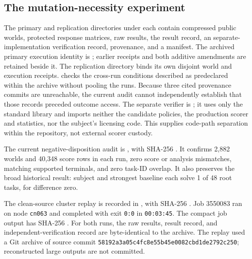 \subsection{The mutation-necessity experiment}
The primary and replication directories under
 each contain compressed public
worlds, protected response matrices, raw results, the result record, an
separate-implementation verification record, provenance, and a 
manifest.
The archived primary execution identity is ;
earlier receipts and both additive amendments are retained beside it. The
replication directory binds its own disjoint world and execution receipts.
 checks the cross-run conditions
described as predeclared within the archive without pooling the runs. Because
three cited provenance commits are unreachable, the current audit cannot
independently establish that those records preceded outcome access. The separate verifier is
; it uses only
the standard library and imports neither the candidate policies, the production
scorer and statistics, nor the subject's licensing code. This supplies code-path
separation within the repository, not external scorer custody.

The current negative-disposition audit is
, with SHA-256
.
It confirms 2,882 worlds and 40,348 score rows in each run, zero score or
analysis mismatches, matching supported terminals, and zero task-ID overlap.
It also preserves the broad historical result: subject and strongest baseline
each solve 1 of 48 root tasks, for difference zero.

The clean-source cluster replay is recorded in
,
with SHA-256
.
Job 3550083 ran on node \texttt{cn063} and completed with exit \texttt{0:0} in
\texttt{00:03:45}. The compact job output has SHA-256
.
For both runs, the raw results, result record, and independent-verification
record are byte-identical to the archive. The replay used a Git archive of
source commit \texttt{58192a3a05c4fc8e55b45e0082cbd1de2792c250}; reconstructed
large outputs are not committed.

